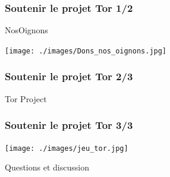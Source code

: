 \documentclass{beamer}
\begin{document}
\begin{frame}
\frametitle{Soutenir le projet Tor 1/2}

\begin{block}{NosOignons}
\begin{itemize}
\end{itemize}
\begin{center}
\texttt{[image: ./images/Dons\_nos\_oignons.jpg]}
\end{center}
\end{block}
 \end{frame}
\begin{frame}
\frametitle{Soutenir le projet Tor 2/3}
\begin{block}{Tor Project}
\begin{itemize}
\end{itemize}
\end{block}
 \end{frame}

\begin{frame}
\frametitle{Soutenir le projet Tor 3/3}
\begin{center}
\texttt{[image: ./images/jeu\_tor.jpg]}
\end{center}
\end{frame}

\begin{frame}
\begin{center}
\Huge{Questions et discussion}
\end{center}
\end{frame}
\end{document}
